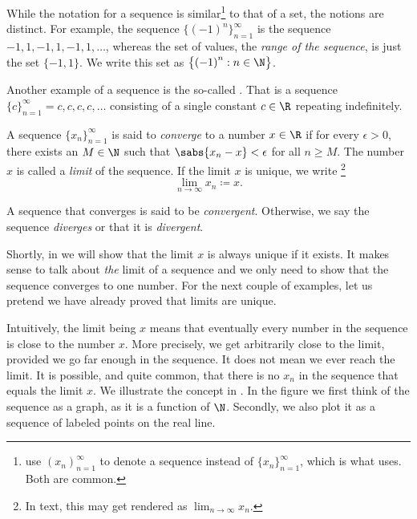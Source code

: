 While the notation for a sequence
is similar\footnote{\cite{BS} use $(x_n)_{n=1}^\infty$ to denote
a sequence instead of $\{ x_n \}_{n=1}^\infty$, which is what \cite{Rudin:baby} uses.
Both are common.}
to that of a set, the notions are
distinct.  For example, the sequence $\bigl\{ {(-1)}^n \bigr\}_{n=1}^\infty$ is the sequence
$-1,1,-1,1,-1,1,\ldots$, whereas the set of values, the
\emph{range of the sequence},
is just the set $\{ -1, 1 \}$.  We write this set
as $\bigl\{ {(-1)}^n : n \in \N \bigr\}$.

Another example of a sequence is the so-called \emph{}.
That is a sequence $\{ c \}_{n=1}^\infty = c,c,c,c,\ldots$ consisting of a single
constant $c \in \R$ repeating indefinitely.


\begin{defn}
A sequence $\{ x_n \}_{n=1}^\infty$ is said to \emph{converge} to a number
$x \in \R$ if for every $\epsilon > 0$, there exists an $M \in \N$ such
that $\sabs{x_n - x} < \epsilon$ for all $n \geq M$.
The number $x$ is called a \emph{limit} of the sequence.
If the limit $x$ is unique, we write%
\footnote{In text, this may get rendered as $\lim_{n\to\infty} x_n$.}
%
\begin{equation*}
\lim_{n\to \infty} x_n \coloneqq x .
\end{equation*}

A sequence
that converges is said to be \emph{convergent}.
Otherwise, we say the sequence \emph{diverges}
or that it is
\emph{divergent}.
\end{defn}

Shortly, in  we will show that the limit $x$ is always
unique if it exists.  It makes sense to talk about \emph{the} limit of
a sequence and we only need to show that the sequence converges to one
number.
For the next couple of examples, let us pretend
we have already proved that limits are unique.

Intuitively, the limit being $x$ means that eventually
every number in the sequence is close to the number $x$.  More precisely,
we get arbitrarily close to the limit, provided we go far enough in the
sequence.  It does not mean we ever reach the limit.  It is possible,
and quite common, that there is no $x_n$ in the sequence that equals the
limit $x$.
We illustrate the concept in .  In the
figure we first think of the sequence as a graph, as it is a function of
$\N$.   Secondly, we also plot it as a sequence of labeled points on the real
line.

